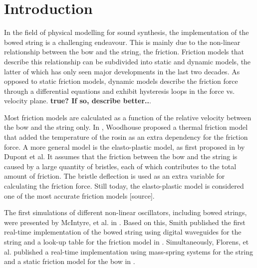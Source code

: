 \documentclass[twoside,a4paper]{article}
\title{\papertitle}
\newif\ifpdf
\begin{document}
\ifpdf %
  \DeclareGraphicsExtensions{.png,.jpg,.pdf, .eps} 
\else  %
\fi

\maketitle

\begin{abstract}
This paper describes the a real-time implementation of the elasto-plastic friction model applied to a stiff string implemented using finite-difference schemes (FDSs). 
\end{abstract}

\section{Introduction}
\label{sec:intro}
In the field of physical modelling for sound synthesis, the implementation of the bowed string is a challenging endeavour. This is mainly due to the non-linear relationship between the bow and the string, the friction. Friction models that describe this relationship can be subdivided into static and dynamic models, the latter of which has only seen major developments in the last two decades. As opposed to static friction models, dynamic models describe the friction force through a differential equations and exhibit hysteresis loops in the force vs. velocity plane. \textbf{true? If so, describe better..}. 

Most friction models are calculated as a function of the relative velocity between the bow and the string only. In \cite{Woodhouse2003}, Woodhouse proposed a thermal friction model that added the temperature of the rosin as an extra dependency for the friction force. A more general model is the elasto-plastic model, as first proposed in \cite{Dupont2002} by Dupont et al. It assumes that the friction between the bow and the string is caused by a large quantity of bristles, each of which contributes to the total amount of friction. The bristle deflection is used as an extra variable for calculating the friction force. Still today, the elasto-plastic model is considered one of the most accurate friction models [source]. 

The first simulations of different non-linear oscillators, including bowed strings, were presented by McIntyre, et al. in \cite{McIntyre1983}. Based on this, Smith published the first real-time implementation of the bowed string using digital waveguides for the string and a look-up table for the friction model in \cite{Smith1986}. Simultaneously, Florens, et al. published a real-time implementation using mass-spring systems for the string and a static friction model for the bow in \cite{Florens1986}.
\end{document}
